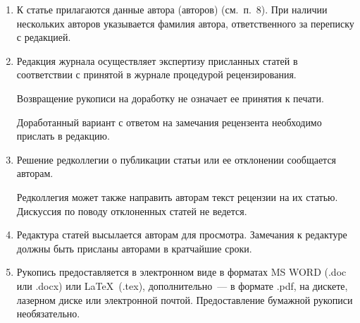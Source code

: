{\begin{enumerate}[1.]
{\bfseries\textit{Соглашение о передаче права на публикацию:}}

\noindent
<<\textit{Мы, нижеподписавшиеся, авторы рукописи <<\ldots>>, передаем учредителям 
и редколлегии журнала <<Информатика и её применения>> неисключительное 
право опубликовать данную рукопись статьи на русском языке как в печатной, так и в 
электронной версиях журнала. Мы подтверждаем, что данная публикация не нарушает 
авторского права других лиц или организаций.} 
 
\textit{Подписи авторов: (ф. и. о., дата, адрес)>>.}
  
 
Это соглашение может быть представлено в бумажном виде или в виде отсканированной 
копии (с подписями авторов).  
 

Редколлегия вправе запросить у авторов экспертное заключение о возможности 
пуб\-ли\-ка\-ции пред\-став\-лен\-ной статьи в открытой печати.\\[-13.5pt]  

\item К статье прилагаются данные автора (авторов) (см.\ п.~8). При наличии нескольких 
авторов указывается фамилия автора, ответственного за переписку с редакцией.\\[-13.5pt]  

\item Редакция журнала осуществляет экспертизу присланных статей в соответствии с 
принятой в журнале процедурой рецензирования.

Возвращение рукописи на доработку не означает ее принятия к печати.  

Доработанный вариант с ответом на замечания рецензента необходимо прислать в 
редакцию.\\[-13.5pt]  

\item Решение редколлегии о публикации статьи или ее отклонении сообщается авторам.  

Редколлегия может также направить авторам текст рецензии на их статью. Дискуссия по 
поводу отклоненных статей не ведется.\\[-13.5pt]  


\item Редактура статей высылается авторам для просмотра. Замечания к редактуре должны 
быть присланы авторами в кратчайшие сроки.\\[-13.5pt]  

\item Рукопись предоставляется в электронном виде в форматах MS WORD (.doc или 
.docx) или \LaTeX\  (.tex), дополнительно~--- в формате .pdf, на дискете, лазерном диске 
или электронной почтой. Предоставление бумажной рукописи необязательно.\\[-13.5pt] 


\end{enumerate}}
